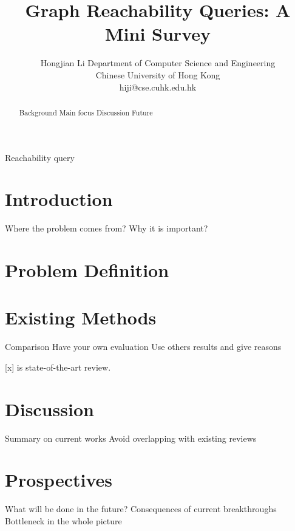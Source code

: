 \documentclass[12pt, conference, compsocconf]{../IEEEtran}
\begin{document}
\title{Graph Reachability Queries: A Mini Survey}
\author
{
\IEEEauthorblockN
{
Hongjian Li
\IEEEauthorblockA
{
Department of Computer Science and Engineering\\
Chinese University of Hong Kong\\
hiji@cse.cuhk.edu.hk
}
}
}
\maketitle

\begin{abstract}

Background
Main focus
Discussion
Future

\end{abstract}

\begin{IEEEkeywords}

Reachability query

\end{IEEEkeywords}

\section{Introduction}

Where the problem comes from?
Why it is important?

\section{Problem Definition}



\section{Existing Methods}

Comparison
Have your own evaluation
Use others results and give reasons

[x] is state-of-the-art review.

\section{Discussion}

Summary on current works
  Avoid overlapping with existing reviews

\section{Prospectives}

What will be done in the future?
  Consequences of current breakthroughs
  Bottleneck in the whole picture



\end{document}
